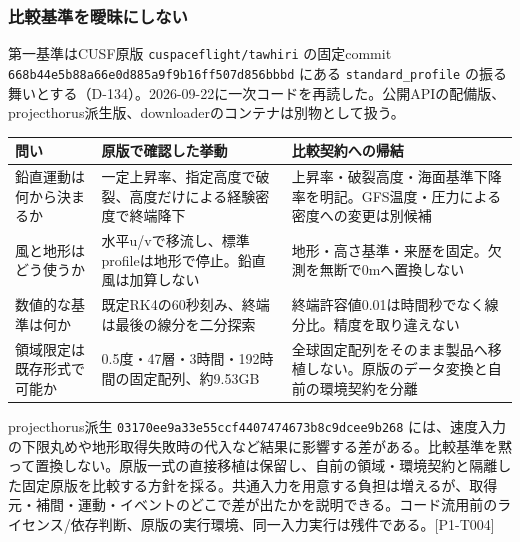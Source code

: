 \documentclass[11pt,a4paper]{article}
\newcounter{none}
\begin{document}
\subsubsection{比較基準を曖昧にしない}\label{ux6bd4ux8f03ux57faux6e96ux3092ux66d6ux6627ux306bux3057ux306aux3044}

第一基準はCUSF原版 \texttt{cuspaceflight/tawhiri} の固定commit
\texttt{668b44e5b88a66e0d885a9f9b16ff507d856bbbd} にある
\texttt{standard\_profile}
の振る舞いとする（D-134）。2026-09-22に一次コードを再読した。公開APIの配備版、projecthorus派生版、downloaderのコンテナは別物として扱う。

{\def\LTcaptype{none} %
\begin{longtable}[]{@{}
  >{\raggedright\arraybackslash}p{}
  >{\raggedright\arraybackslash}p{}
  >{\raggedright\arraybackslash}p{}@{}}
\toprule\noalign{}
\begin{minipage}[b]{\linewidth}\raggedright
問い
\end{minipage} & \begin{minipage}[b]{\linewidth}\raggedright
原版で確認した挙動
\end{minipage} & \begin{minipage}[b]{\linewidth}\raggedright
比較契約への帰結
\end{minipage} \\
\midrule\noalign{}
\endhead
\bottomrule\noalign{}
\endlastfoot
鉛直運動は何から決まるか &
一定上昇率、指定高度で破裂、高度だけによる経験密度で終端降下 &
上昇率・破裂高度・海面基準下降率を明記。GFS温度・圧力による密度への変更は別候補 \\
風と地形はどう使うか &
水平u/vで移流し、標準profileは地形で停止。鉛直風は加算しない &
地形・高さ基準・来歴を固定。欠測を無断で0mへ置換しない \\
数値的な基準は何か & 既定RK4の60秒刻み、終端は最後の線分を二分探索 &
終端許容値0.01は時間秒でなく線分比。精度を取り違えない \\
領域限定は既存形式で可能か &
0.5度・47層・3時間・192時間の固定配列、約9.53GB &
全球固定配列をそのまま製品へ移植しない。原版のデータ変換と自前の環境契約を分離 \\
\end{longtable}
}

projecthorus派生 \texttt{03170ee9a33e55ccf4407474673b8c9dcee9b268}
には、速度入力の下限丸めや地形取得失敗時の代入など結果に影響する差がある。比較基準を黙って置換しない。原版一式の直接移植は保留し、自前の領域・環境契約と隔離した固定原版を比較する方針を採る。共通入力を用意する負担は増えるが、取得元・補間・運動・イベントのどこで差が出たかを説明できる。コード流用前のライセンス/依存判断、原版の実行環境、同一入力実行は残件である。{[}P1-T004{]}
\end{document}
